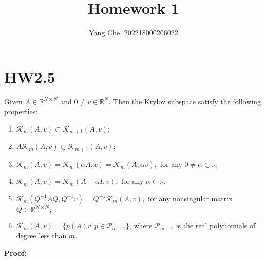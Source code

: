 \documentclass{article}
\title{Homework 1} %
\author{Yang Che,  202218000206022} %
\date{} %
\begin{document}

\maketitle %

\section{HW2.5}
Given $A\in\mathbb{R}^{N\times N}$ and $0\neq v\in\mathbb{R}^N$. Then the Krylov subspace satisfy the following properties:
\begin{enumerate}[(1)]
    \item $\mathcal{K}_m(A,v)\subset \mathcal{K}_{m+1}(A,v) ;$
    \item $A\mathcal{K}_m(A,v)\subset \mathcal{K}_{m+1}(A,v) ;$
    \item $\mathcal{K}_m(A,v) =\mathcal{K}_{m}(\alpha A,v)=\mathcal{K}_{m}(A,\alpha v) ,$ for any $0\neq \alpha \in\mathbb{R};$

    \item $\mathcal{K}_m(A,v) =\mathcal{K}_{m}(A-\alpha I, v) ,$ for any   $\alpha \in\mathbb{R};$
    \item $\mathcal{K}_m(Q^{-1}AQ,Q^{-1}v) =Q^{-1}\mathcal{K}_{m}(A, v) ,$ for any nonsingular matrix  $Q\in \mathbb{R}^{N\times N};$
    \item  $\mathcal{K}_m(A,v)=\{p(A)v:p\in\mathcal{P}_{m-1}\}$, where $\mathcal{P}_{m-1}$ is the real polynomials of degree less than $m$.
\end{enumerate}
\textbf{Proof:}
\end{document}
